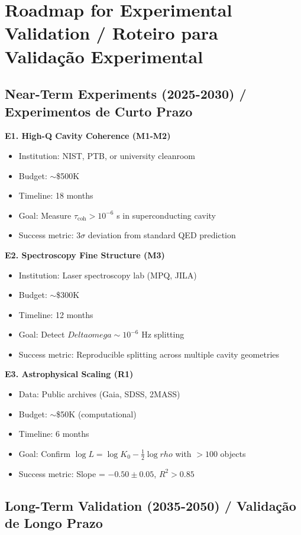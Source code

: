 \documentclass[12pt,a4paper]{article}
\def\rho{rho}%
\def\omega{omega}%
\def\Delta{Delta}%
\begin{document}
\section{Roadmap for Experimental Validation / Roteiro para Validação Experimental}

\subsection{Near-Term Experiments (2025-2030) / Experimentos de Curto Prazo}

\textbf{E1. High-Q Cavity Coherence (M1-M2)}
\begin{itemize}
    \item Institution: NIST, PTB, or university cleanroom
    \item Budget: $\sim$\$500K
    \item Timeline: 18 months
    \item Goal: Measure $\tau_{\text{coh}} > 10^{-6}$ s in superconducting cavity
    \item Success metric: $3\sigma$ deviation from standard QED prediction
\end{itemize}

\textbf{E2. Spectroscopy Fine Structure (M3)}
\begin{itemize}
    \item Institution: Laser spectroscopy lab (MPQ, JILA)
    \item Budget: $\sim$\$300K
    \item Timeline: 12 months
    \item Goal: Detect $\Delta\omega \sim 10^{-6}$ Hz splitting
    \item Success metric: Reproducible splitting across multiple cavity geometries
\end{itemize}

\textbf{E3. Astrophysical Scaling (R1)}
\begin{itemize}
    \item Data: Public archives (Gaia, SDSS, 2MASS)
    \item Budget: $\sim$\$50K (computational)
    \item Timeline: 6 months
    \item Goal: Confirm $\log L = \log K_0 - \frac{1}{2}\log\rho$ with $>100$ objects
    \item Success metric: Slope = $-0.50 \pm 0.05$, $R^2 > 0.85$
\end{itemize}

\subsection{Long-Term Validation (2035-2050) / Validação de Longo Prazo}
\end{document}

